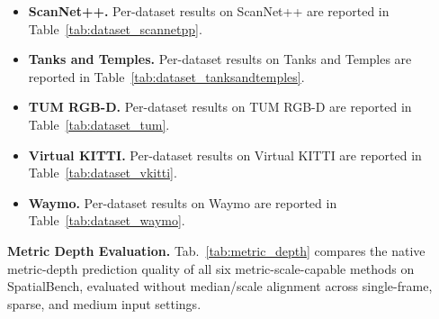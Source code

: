 \documentclass{llmxive}
\providecommand{\benchmark}{SpatialBench\xspace}
\begin{document}
\begin{itemize}
  \item \textbf{ScanNet++.} Per-dataset results on ScanNet++ are reported in Table~\ref{tab:dataset_scannetpp}.
  \item \textbf{Tanks and Temples.} Per-dataset results on Tanks and Temples are reported in Table~\ref{tab:dataset_tanksandtemples}.
  \item \textbf{TUM RGB-D.} Per-dataset results on TUM RGB-D are reported in Table~\ref{tab:dataset_tum}.
  \item \textbf{Virtual KITTI.} Per-dataset results on Virtual KITTI are reported in Table~\ref{tab:dataset_vkitti}.
  \item \textbf{Waymo.} Per-dataset results on Waymo are reported in Table~\ref{tab:dataset_waymo}.
\end{itemize}

\noindent\textbf{Metric Depth Evaluation.}
Tab.~\ref{tab:metric_depth} compares the native metric-depth prediction quality of all six metric-scale-capable methods on \benchmark, evaluated without median/scale alignment across single-frame, sparse, and medium input settings.

\end{document}
